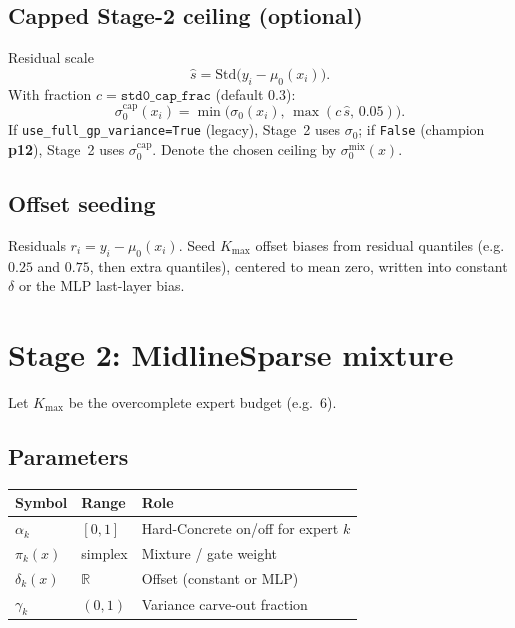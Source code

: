 \documentclass[11pt,a4paper]{article}
\newcommand{\R}{\mathbb{R}}
\newcommand{\Kmax}{K_{\max}}
\begin{document}
\subsection{Capped Stage-2 ceiling (optional)}
Residual scale
\begin{equation}
  \hat s
  =
  \mathrm{Std}\bigl(y_i-\mu_0(x_i)\bigr).
\end{equation}
With fraction \(c=\texttt{std0\_cap\_frac}\) (default \(0.3\)):
\begin{equation}
  \sigma_0^{\mathrm{cap}}(x_i)
  =
  \min\bigl(\sigma_0(x_i),\, \max(c\,\hat s,\, 0.05)\bigr).
\end{equation}
If \texttt{use\_full\_gp\_variance=True} (legacy), Stage~2 uses \(\sigma_0\);
if \texttt{False} (champion \textbf{p12}), Stage~2 uses \(\sigma_0^{\mathrm{cap}}\).
Denote the chosen ceiling by \(\sigma_0^{\mathrm{mix}}(x)\).

\subsection{Offset seeding}
Residuals \(r_i=y_i-\mu_0(x_i)\). Seed \(K_{\max}\) offset biases from residual quantiles
(e.g.\ \(0.25\) and \(0.75\), then extra quantiles), centered to mean zero, written into
constant \(\delta\) or the MLP last-layer bias.

\section{Stage 2: MidlineSparse mixture}

Let \(\Kmax\) be the overcomplete expert budget (e.g.\ \(6\)).

\subsection{Parameters}
\begin{center}
\begin{tabular}{@{}llp{6.2cm}@{}}
\toprule
Symbol & Range & Role \\
\midrule
\(\alpha_k\) & \([0,1]\) & Hard-Concrete on/off for expert \(k\) \\
\(\pi_k(x)\) & simplex & Mixture / gate weight \\
\(\delta_k(x)\) & \(\R\) & Offset (constant or MLP) \\
\(\gamma_k\) & \((0,1)\) & Variance carve-out fraction \\
\bottomrule
\end{tabular}
\end{center}
\end{document}
